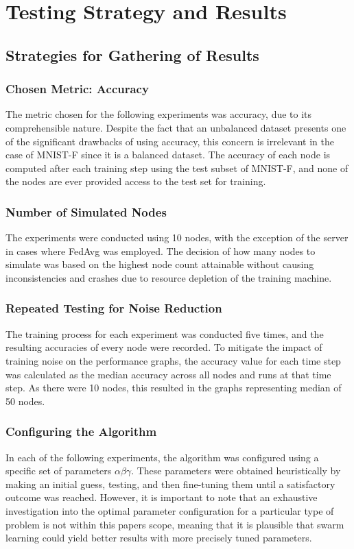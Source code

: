 \chapter{Testing Strategy and Results}
\section{Strategies for Gathering of Results}
\subsection{Chosen Metric: Accuracy}
The metric chosen for the following experiments was accuracy, due to its comprehensible nature. Despite the fact that an unbalanced dataset presents one of the significant drawbacks of using accuracy, this concern is irrelevant in the case of MNIST-F since it is a balanced dataset. The accuracy of each node is computed after each training step using the test subset of MNIST-F, and none of the nodes are ever provided access to the test set for training.

\subsection{Number of Simulated Nodes}
The experiments were conducted using 10 nodes, with the exception of the server in cases where FedAvg was employed. The decision of how many nodes to simulate was based on the highest node count attainable without causing inconsistencies and crashes due to resource depletion of the training machine.

\subsection{Repeated Testing for Noise Reduction}
The training process for each experiment was conducted five times, and the resulting accuracies of every node were recorded. To mitigate the impact of training noise on the performance graphs, the accuracy value for each time step was calculated as the median accuracy across all nodes and runs at that time step. As there were 10 nodes, this resulted in the graphs representing median of 50 nodes.

\subsection{Configuring the Algorithm}
In each of the following experiments, the algorithm was configured using a specific set of parameters $\alpha \beta \gamma$. These parameters were obtained heuristically by making an initial guess, testing, and then fine-tuning them until a satisfactory outcome was reached. However, it is important to note that an exhaustive investigation into the optimal parameter configuration for a particular type of problem is not within this papers scope, meaning that it is plausible that swarm learning could yield better results with more precisely tuned parameters.

